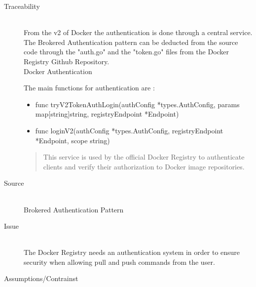 \begin{description}

\item[Traceability]~\\
From the v2 of Docker the authentication is done through a central service. \\
The Brokered Authentication pattern can be deducted from the source code through the "auth.go" and the "token.go" files from the Docker Registry Github Repository. \\
Docker Authentication \cite{dockauth}

The main functions for authentication are : \\
\begin{itemize}
\item func tryV2TokenAuthLogin(authConfig *types.AuthConfig, params map[string]string, registryEndpoint *Endpoint)
\item func loginV2(authConfig *types.AuthConfig, registryEndpoint *Endpoint, scope string) 
\end{itemize}

\begin{quote}
This service is used by the official Docker Registry to authenticate clients and verify their authorization to Docker image repositories.
\end{quote}

\item[Source]~\\
Brokered Authentication Pattern\cite{brokeredauth} \\

\item[Issue]~\\ The Docker Registry needs an authentication system in order to ensure security when allowing pull and push commands from the user.

\item[Assumptions/Contrainst]~\\ 




\end{description}
